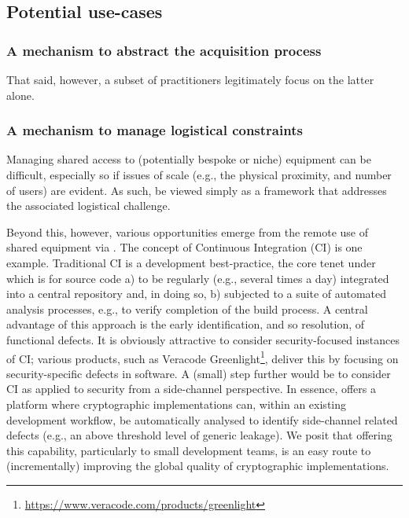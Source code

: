
\subsection{Potential use-cases}


\subsubsection{A mechanism to abstract the acquisition process}


That said, however, a subset of practitioners legitimately focus on the
latter alone.



\subsubsection{A mechanism to manage logistical constraints}

Managing shared access to (potentially bespoke or niche) equipment can be 
difficult, especially so if issues of scale (e.g., the physical proximity, 
and number of users) are evident.  As such,  be viewed 
simply as a framework that addresses the associated logistical challenge.

Beyond this, however, various opportunities emerge from the remote use of
shared equipment via \SCAAASID.  The concept of Continuous Integration (CI)
is one example.  Traditional CI is a development best-practice, the core 
tenet under which is for source code 
a) to be regularly (e.g., several times a day) integrated into a central repository 
   and, in doing so, 
b) subjected to a suite of automated analysis processes, e.g., to verify completion of the build process.
A central advantage of this approach is the early identification, and so
resolution, of functional defects.  
It is obviously attractive to consider security-focused instances of CI;
various products, such as Veracode Greenlight\footnote{
\url{https://www.veracode.com/products/greenlight}
}, deliver this by focusing on security-specific defects in software.  A
(small) step further would be to consider CI as applied to security from
a side-channel perspective.  In essence, \SCAAASID offers a platform where 
cryptographic implementations can, within an existing development workflow,
be automatically analysed to identify side-channel related defects (e.g., 
an above threshold level of generic leakage).
We posit that offering this capability, particularly to small development
teams, is an easy route to (incrementally) improving the global quality 
of cryptographic implementations.

